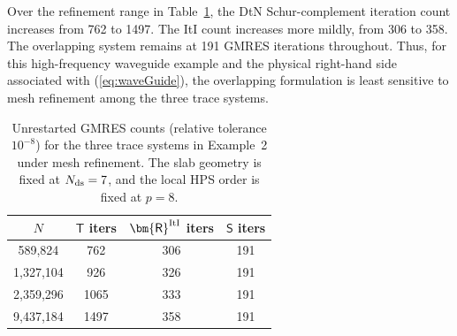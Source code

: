 \documentclass[final,onefignum,onetabnum]{siamart250211}
\newcommand{\mtx}[1]{\bm{\mathsf{#1}}}
\theoremstyle{definition}
\begin{document}
Over the refinement range in Table~\ref{tab:example2_conditioning}, the DtN
Schur-complement iteration count increases from 762 to 1497.  The ItI count
increases more mildly, from 306 to 358.  The overlapping system remains at
191 GMRES iterations throughout.  Thus, for this high-frequency waveguide
example and the physical right-hand side associated with (\ref{eq:waveGuide}),
the overlapping formulation is least sensitive to mesh refinement among the
three trace systems.

\begin{table}[H]
\centering
\caption{Unrestarted GMRES counts (relative tolerance $10^{-8}$) for the three trace systems in Example~2 under mesh refinement. The slab geometry is fixed at $N_{\rm ds}=7$, and the local HPS order is fixed at $p=8$.}
\label{tab:example2_conditioning}
\begin{tabular}{c|ccc}
$N$ & $\mtx{T}$ iters & $\mtx{R}^{\rm ItI}$ iters & $\mtx{S}$ iters\\ %
\hline
589{,}824   & 762  & 306 & 191\\ %
1{,}327{,}104 & 926  & 326 & 191\\%
2{,}359{,}296 & 1065 & 333 & 191 \\%
9{,}437{,}184 & 1497 & 358 & 191 \\ %
\end{tabular}
\end{table}
\end{document}
